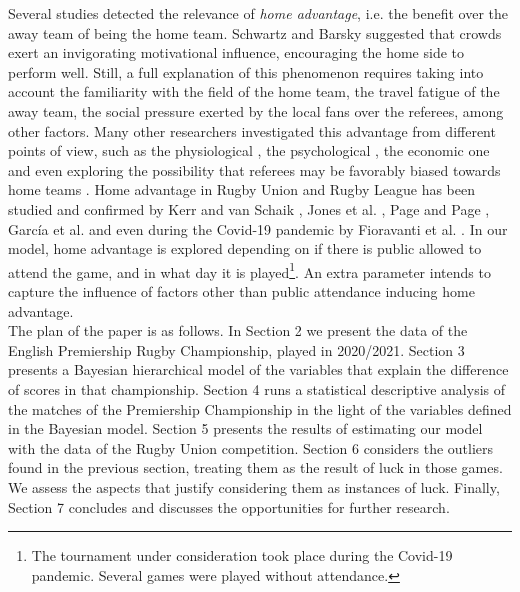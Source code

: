 \documentclass[]{article}
\begin{document}
Several studies detected the relevance of \textit{home advantage}, i.e. the benefit over the away team of being the home team. Schwartz and Barsky \cite{schwartz1977home} suggested that crowds exert an invigorating motivational influence, encouraging the home side to perform well. Still, a full explanation of this phenomenon requires taking into account the familiarity with the field of the home team, the travel fatigue of the away team, the social pressure exerted by the local fans over the referees, among other factors. Many other researchers investigated this advantage from different points of view, such as the physiological \cite{neave2003testosterone}, the psychological \cite{agnew1994crowd,legaz2013home}, the economic one \cite{carmichael2005home,boudreaux2017natural,ponzo2018does} and even exploring the possibility that referees may be favorably biased towards home teams \cite{downward2007effects,page2010evidence}. Home advantage in Rugby Union and Rugby League has been studied and confirmed by Kerr and van Schaik \cite{kerr1995effects}, Jones et al. \cite{jones2007home}, Page and Page \cite{page2010alone}, García et al. \cite{garcia2013home} and even during the Covid-19 pandemic by Fioravanti et al. \cite{fioravanti2021home}. In our model, home advantage is explored depending on if there is public allowed to attend the game, and in what day it is played\footnote{The tournament under consideration took place during the Covid-19 pandemic. Several games were played without attendance.}. An extra parameter intends to capture the influence of factors other than public attendance inducing home advantage.\\

The plan of the paper is as follows. In Section 2 we present the data of the English Premiership Rugby Championship, played in 2020/2021. Section 3 presents a Bayesian hierarchical model of the variables that explain the difference of scores in that championship. Section 4 runs a statistical descriptive analysis of the matches of the Premiership Championship in the light of the variables defined in the Bayesian model. Section 5 presents the results of estimating our model with the data of the Rugby Union competition. Section 6 considers the outliers found in the previous section, treating them as the result of luck in those games. We assess the aspects that justify considering them as instances of luck. Finally, Section 7 concludes and discusses the opportunities for further research.\\
\end{document}
